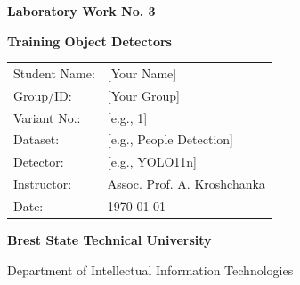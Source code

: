 \documentclass[12pt, a4paper]{article}
\begin{document}
\begin{titlepage}
    \centering
    \vspace*{2cm}
    
    {\Huge \bfseries \textcolor{primary}{Laboratory Work No. 3} \par}
    \vspace{0.5cm}
    {\LARGE \textbf{Training Object Detectors} \par}
    \vspace{2cm}
    
    \begin{table}[h]
        \centering
        \large
        \renewcommand{\arraystretch}{1.5}
        \begin{tabular}{l l}
            Student Name: & [Your Name] \\
            Group/ID: & [Your Group] \\
            Variant No.: & [e.g., 1] \\
            Dataset: & [e.g., People Detection] \\
            Detector: & [e.g., YOLO11n] \\
            Instructor: & Assoc. Prof. A. Kroshchanka \\
            Date: & \today \\
        \end{tabular}
    \end{table}
    
    \vfill
    {\large \textbf{Brest State Technical University} \par}
    {\large Department of Intellectual Information Technologies \par}
    \vspace*{2cm}
\end{titlepage}

\begin{abstract}
    \noindent This report details the process of training a neural network object detector using the YOLO (You Only Look Once) architecture. The objective is to configure a custom dataset, organize the training pipeline for a specific YOLO variant, and evaluate the model's performance using standard metrics such as mean Average Precision (mAP). Finally, the trained detector is tested on arbitrary images sourced from the Internet to visualize its real-world inference capabilities.
\end{abstract}
\end{document}
